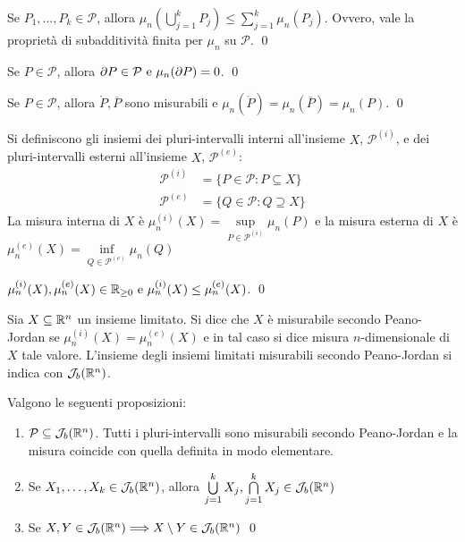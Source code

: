 \begin{corollary}
    Se $P_1,\dots,P_k \in \mathcal{P}$, allora $\mu_n\left(\bigcup\limits_{j=1}^kP_j\right) \leq \sum\limits_{j=1}^k\mu_n(P_j)$. Ovvero, vale la proprietà di subadditività finita per $\mu_n$ su $\mathcal{P}$.
    \qed
\end{corollary}

\begin{lemma}
    Se $P \in \mathcal{P}$, allora $\partial P \in \mathcal{P} \text{ e } \mu_n(\partial P)=0$.
    \qed
\end{lemma}

\begin{corollary}
    Se $P \in \mathcal{P}$, allora $\mathring P, \overline{P}$ sono misurabili e $\mu_n(\mathring P)=\mu_n(\overline{P})=\mu_n(P)$.
    \qed
\end{corollary}

\begin{definition}
    Si definiscono gli insiemi dei pluri-intervalli interni all'insieme $X$, $\mathcal{P}^{(i)}$, e dei pluri-intervalli esterni all'insieme $X$, $\mathcal{P}^{(e)}$:
    \begin{align*}
        \mathcal{P}^{(i)}&=\{P\in \mathcal{P}:P\subseteq X\}\\
        \mathcal{P}^{(e)}&=\{Q \in \mathcal{P}: Q \supseteq X \}
    \end{align*}
    La misura interna di $X$ è $
        \mu_n^{(i)}(X)=\sup\limits_{P\in \mathcal{P}^{(i)}}\mu_n(P)
    $
    e la misura esterna di $X$ è $
        \mu_n^{(e)}(X)=\inf\limits_{Q \in \mathcal{P}^{(e)}}\mu_n(Q)
    $
\end{definition}

\begin{lemma}
    $\mu_n^{(i)}(X), \mu_n^{(e)}(X) \in \mathbb{R}_{\geq 0} \text{ e } \mu_n^{(i)}(X)\leq\mu_n^{(e)}(X)$.
    \qed
\end{lemma}

\begin{definition}
    Sia $X \subseteq \mathbb{R}^n$ un insieme limitato. Si dice che $X$ è misurabile secondo Peano-Jordan se $\mu_n^{(i)}(X)=\mu_n^{(e)}(X)$ e in tal caso si dice misura $n$-dimensionale di $X$ tale valore.
    L'insieme degli insiemi limitati misurabili secondo Peano-Jordan si indica con $\mathcal{J}_b(\mathbb{R}^n)$.
\end{definition}

\begin{lemma} Valgono le seguenti proposizioni:
    \begin{enumerate}
        \item $\mathcal{P} \subseteq \mathcal{J}_b(\mathbb{R}^n)$. Tutti i pluri-intervalli sono misurabili secondo Peano-Jordan e la misura coincide con quella definita in modo elementare.
        \item Se $X_1,\dots,X_k \in \mathcal{J}_b(\mathbb{R}^n)$, allora $\bigcup\limits_{j=1}^k X_j, \bigcap\limits_{j=1}^kX_j \in \mathcal{J}_b(\mathbb{R}^n)$
        \item Se $X,Y \in \mathcal{J}_b(\mathbb{R}^n)\Longrightarrow X \setminus Y \in \mathcal{J}_b(\mathbb{R}^n)$
        \qed
    \end{enumerate}
\end{lemma}

